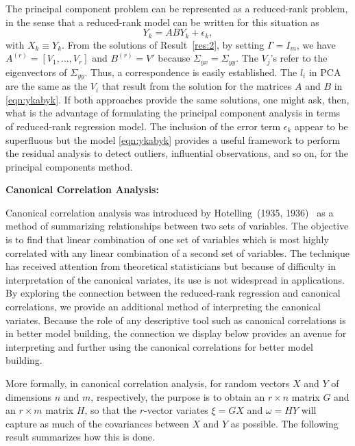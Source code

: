 The principal component problem can be represented as a reduced-rank problem, in the sense that a reduced-rank model can be written for this situation as
	\begin{equation} \label{eqn:ykabyk}
	Y_k= ABY_k + \epsilon_k,
	\end{equation}
with $X_k \equiv Y_k$. From the solutions of Result~\ref{res:2}, by setting $\Gamma= I_m$, we have $A^{(r)}= [V_1, \ldots, V_r]$ and $B^{(r)}= V'$ because $\Sigma_{yx}= \Sigma_{yy}$. The $V_j$'s refer to the eigenvectors of $\Sigma_{yy}$. Thus, a correspondence is easily established. The $l_i$ in PCA are the same as the $V_i$ that result from the solution for the matrices $A$ and $B$ in \eqref{eqn:ykabyk}. If both approaches provide the same solutions, one might ask, then, what is the advantage of formulating the principal component analysis in terms of reduced-rank regression model. The inclusion of the error term $\epsilon_k$ appear to be superfluous but the model \eqref{eqn:ykabyk} provides a useful framework to perform the residual analysis to detect outliers, influential observations, and so on, for the principal components method. \twomedskip


\noindent \textbf{Canonical Correlation Analysis:} \twomedskip


\noindent Canonical correlation analysis was introduced by Hotelling~(1935, 1936)~\cite{hotelling35,hotelling36} as a method of summarizing relationships between two sets of variables. The objective is to find that linear combination of one set of variables which is most highly correlated with any linear combination of a second set of variables. The technique has received attention from theoretical statisticians but because of difficulty in interpretation of the canonical variates, its use is not widespread in applications. By exploring the connection between the reduced-rank regression and canonical correlations, we provide an additional method of interpreting the canonical variates. Because the role of any descriptive tool such as canonical correlations is in better model building, the connection we display below provides an avenue for interpreting and further using the canonical correlations for better model building.


More formally, in canonical correlation analysis, for random vectors $X$ and $Y$ of dimensions $n$ and $m$, respectively, the purpose is to obtain an $r \times n$ matrix $G$ and an $r \times m$ matrix $H$, so that the $r$-vector variates $\xi= GX$ and $\omega= HY$ will capture as much of the covariances between $X$ and $Y$ as possible. The following result summarizes how this is done.


